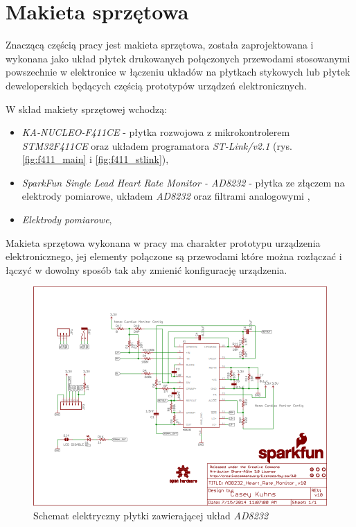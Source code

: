 
\chapter{Makieta sprzętowa}

Znaczącą częścią pracy jest makieta sprzętowa, została zaprojektowana i wykonana jako układ płytek drukowanych połączonych
przewodami stosowanymi powszechnie w elektronice w łączeniu układów na płytkach stykowych lub płytek deweloperskich
będących częścią prototypów urządzeń elektronicznych.


W skład makiety sprzętowej wchodzą:

\begin{itemize}

    \item \textit{KA-NUCLEO-F411CE} - płytka rozwojowa z mikrokontrolerem \textit{STM32F411CE} oraz układem programatora \textit{ST-Link/v2.1} \cite{NUCLEO} (rys. \ref{fig:f411_main} i \ref{fig:f411_stlink}),

    \item \textit{SparkFun Single Lead Heart Rate Monitor - AD8232} - płytka ze złączem na elektrody pomiarowe, układem \textit{AD8232} oraz filtrami analogowymi \cite{AD8232BS},

    \item \textit{Elektrody pomiarowe},

\end{itemize}


Makieta sprzętowa wykonana w pracy ma charakter prototypu urządzenia elektronicznego, jej elementy połączone są przewodami które można rozłączać i łączyć w dowolny sposób tak aby zmienić konfigurację urządzenia.

\begin{figure}[h!]
    \centering 
    \includegraphics[scale=0.6]{pl/media/ad8232_sch.png}
    \caption{Schemat elektryczny płytki \cite{AD8232BS} zawierającej układ \textit{AD8232}}
    \label{fig:ad8232_sch}
\end{figure}

